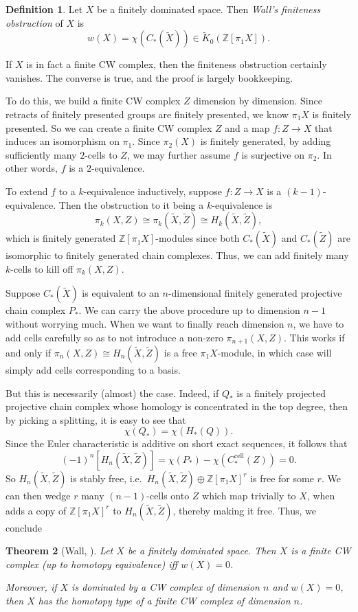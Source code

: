 \documentclass[a4paper, 12pt]{article}
\newtheorem{thm}{Theorem}[section]
\theoremstyle{definition}
\newtheorem{defi}[thm]{Definition}
\newcommand\Z{\mathbb{Z}}
\newcommand\cell{\mathrm{cell}}
\begin{document}
\begin{defi}
  Let $X$ be a finitely dominated space. Then \emph{Wall's finiteness obstruction} of $X$ is
  \[
    w(X) = \chi(C_*(\tilde{X})) \in \tilde{K}_0(\Z[\pi_1 X]).
  \]
\end{defi}
If $X$ is in fact a finite CW complex, then the finiteness obstruction certainly vanishes. The converse is true, and the proof is largely bookkeeping.

To do this, we build a finite CW complex $Z$ dimension by dimension. Since retracts of finitely presented groups are finitely presented, we know $\pi_1 X$ is finitely presented. So we can create a finite CW complex $Z$ and a map $f: Z \to X$ that induces an isomorphism on $\pi_1$. Since $\pi_2(X)$ is finitely generated, by adding sufficiently many $2$-cells to $Z$, we may further assume $f$ is surjective on $\pi_2$. In other words, $f$ is a $2$-equivalence.

To extend $f$ to a $k$-equivalence inductively, suppose $f: Z \to X$ is a $(k - 1)$-equivalence. Then the obstruction to it being a $k$-equivalence is
\[
  \pi_k(X, Z) \cong \pi_k(\tilde{X}, \tilde{Z}) \cong H_k(\tilde{X}, \tilde{Z}),
\]
which is finitely generated $\Z[\pi_1 X]$-modules since both $C_*(\tilde{X})$ and $C_*(\tilde{Z})$ are isomorphic to finitely generated chain complexes. Thus, we can add finitely many $k$-cells to kill off $\pi_k(X, Z)$.

Suppose $C_*(\tilde{X})$ is equivalent to an $n$-dimensional finitely generated projective chain complex $P_*$. We can carry the above procedure up to dimension $n - 1$ without worrying much. When we want to finally reach dimension $n$, we have to add cells carefully so as to not introduce a non-zero $\pi_{n + 1}(X, Z)$. This works if and only if $\pi_n(X, Z) \cong H_n(\tilde{X}, \tilde{Z})$ is a free $\pi_1 X$-module, in which case will simply add cells corresponding to a basis.

But this is necessarily (almost) the case. Indeed, if $Q_*$ is a finitely projected projective chain complex whose homology is concentrated in the top degree, then by picking a splitting, it is easy to see that
\[
  \chi(Q_*) = \chi(H_*(Q)).
\]
Since the Euler characteristic is additive on short exact sequences, it follows that
\[
  (-1)^n [H_n(\tilde{X}, \tilde{Z})] = \chi(P_*) - \chi(C_*^{\cell}(Z)) = 0.
\]
So $H_n(\tilde{X}, \tilde{Z})$ is stably free, i.e.\ $H_n(\tilde{X}, \tilde{Z}) \oplus \Z[\pi_1 X]^r$ is free for some $r$. We can then wedge $r$ many $(n-1)$-cells onto $Z$ which map trivially to $X$, when adds a copy of $\Z[\pi_1 X]^r$ to $H_n(\tilde{X}, \tilde{Z})$, thereby making it free. Thus, we conclude
\begin{thm}[Wall, \cite{wall-finiteness}]
  Let $X$ be a finitely dominated space. Then $X$ is a finite CW complex (up to homotopy equivalence) iff $w(X) = 0$.

  Moreover, if $X$ is dominated by a CW complex of dimension $n$ and $w(X) = 0$, then $X$ has the homotopy type of a finite CW complex of dimension $n$.
\end{thm}
\end{document}
